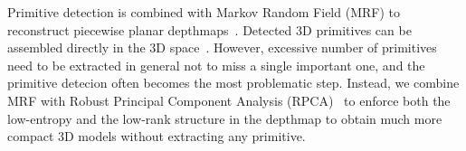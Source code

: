 Primitive detection is combined with Markov Random Field (MRF) to
reconstruct piecewise planar depthmaps~\cite{ManhattanWorldStereo}.
Detected 3D primitives can be assembled directly in the 3D
space~\cite{eccv_museum}.  However, excessive number of primitives need
to be extracted in general not to miss a single important one, and the
primitive detecion often becomes the most problematic step. Instead, we
combine MRF with Robust Principal Component Analysis
(RPCA)~\cite{Candes2011} to enforce both the low-entropy and the
low-rank structure in the depthmap to obtain much more compact 3D models
without extracting any primitive.

%
%



